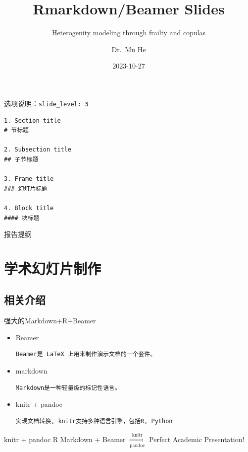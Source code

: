 \documentclass[
  12pt,
  ignorenonframetext,
  aspectratio=169, 12pt,table,t,utf-8]{beamer}
\title{Rmarkdown/Beamer Slides}
\subtitle{Heterogenity modeling through frailty and copulas}
\author{Dr.~Mu He}
\date{2023-10-27}
\institute{Xi'an Jiaotong-Liverpool University}
\begin{document}
\frame{\titlepage}

\begin{frame}[fragile]{选项说明：\texttt{slide\_level:\ 3}}
\protect\hypertarget{ux9009ux9879ux8bf4ux660eslide_level-3}{}
\begin{verbatim}
1. Section title 
# 节标题

2. Subsection title
## 子节标题

3. Frame title
### 幻灯片标题

4. Block title 
#### 块标题
\end{verbatim}
\end{frame}

\begin{frame}{报告提纲}
\protect\hypertarget{ux62a5ux544aux63d0ux7eb2}{}
\tableofcontents
\end{frame}

\hypertarget{ux5b66ux672fux5e7bux706fux7247ux5236ux4f5c}{%
\section{学术幻灯片制作}\label{ux5b66ux672fux5e7bux706fux7247ux5236ux4f5c}}

\hypertarget{ux76f8ux5173ux4ecbux7ecd}{%
\subsection{相关介绍}\label{ux76f8ux5173ux4ecbux7ecd}}

\begin{frame}[fragile]{强大的Markdown+R+Beamer}
\protect\hypertarget{ux5f3aux5927ux7684markdownrbeamer}{}
\begin{itemize}
\item
  Beamer

\begin{verbatim}
Beamer是 LaTeX 上用来制作演示文档的一个套件。
\end{verbatim}
\item
  markdown

\begin{verbatim}
Markdown是一种轻量级的标记性语言。
\end{verbatim}
\item
  knitr + pandoc

\begin{verbatim}
实现文档转换, knitr支持多种语言引擎，包括R, Python
\end{verbatim}
\end{itemize}

\begin{block}{knitr + pandoc}
\protect\hypertarget{knitr-pandoc}{}
R Markdown + Beamer
\(\underset{\text{pandoc}}{\overset{\text{knitr}}{\Longrightarrow}}\)
Perfect Academic Presentation!
\end{block}
\end{frame}
\end{document}
